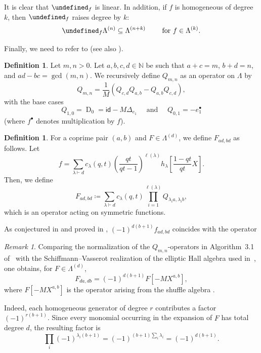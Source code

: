 \documentclass[reqno]{amsart}
\theoremstyle{plain}
\theoremstyle{definition}
\newtheorem{definition}[theorem]{Definition}
\theoremstyle{remark}
\newtheorem{remark}[theorem]{Remark}
\DeclareMathOperator{\D}{D}
\let\oldTheta\Theta
\let\Theta\undefined
\DeclareMathOperator{\Theta}{\oldTheta}
\newcommand{\<}{\langle}
\renewcommand{\>}{\rangle}
\begin{document}
It is clear that $\Theta_f$ is linear. In addition, if $f$ is homogeneous of degree $k$, then $\Theta_f$ raises degree by $k$:
\[\Theta_f \Lambda^{(n)} \subseteq \Lambda^{(n+k)} \qquad \text{ for } f \in \Lambda^{(k)}. \]

Finally, we need to refer to \cite[Algorithm~4.1]{BergeronGarsiaSergelXin2015CompositionalShuffleConjectures} (see also \cite[Definition~1.1, Theorem~2.5]{BergeronGarsiaSergelXin2016PlethysticOperators}).

\begin{definition}
    Let $m, n > 0$. Let $a,b,c,d \in \mathbb{N}$ be such that $a+c=m$, $b+d=n$, and $ad-bc = \gcd(m,n)$. We recursively define $Q_{m,n}$ as an operator on $\Lambda$ by \[ Q_{m,n} = \frac{1}{M} \left( Q_{c,d} Q_{a,b} - Q_{a,b} Q_{c,d} \right), \] with the base cases \[ Q_{1,0} = \D_0 = \mathsf{id} - M \Delta_{e_1} \quad \text{ and } \quad Q_{0,1} = - e_1^\bullet \] (where $f^\bullet$ denotes multiplication by $f$).
\end{definition}

\begin{definition}
    \label{def:hall-algebra-op}
    For a coprime pair $(a,b)$ and $F \in \Lambda^{(d)}$, we define $F_{ad,bd}$ as follows. Let \[ f = \sum_{\lambda \vdash d} c_\lambda(q,t) \left( \frac{qt}{qt-1} \right)^{\ell(\lambda)} h_\lambda \left[ \frac{1-qt}{qt} X \right]. \] Then, we define \[ F_{ad,bd} \coloneqq \sum_{\lambda \vdash d} c_\lambda(q,t) \prod_{i=1}^{\ell(\lambda)} Q_{\lambda_i a, \lambda_i b}, \]
    which is an operator acting on symmetric functions.
\end{definition}

As conjectured in \cite{BergeronGarsiaSergelXin2016PlethysticOperators} and proved in \cite{Mellit2021Rational}, $(-1)^{d(b+1)} f_{ad,bd}$ coincides with the operator 

\begin{remark}
    \label{rmk:eha-notation}
    Comparing the normalization of the $Q_{m,n}$-operators in Algorithm~3.1 of~\cite{BergeronGarsiaSergelXin2015CompositionalShuffleConjectures} with the Schiffmann--Vasserot realization of the elliptic Hall algebra used in~\cite{BHMPS2023ShuffleAnyLine}, one obtains, for $F \in \Lambda^{(d)}$,
    \[
        F_{da,db}= (-1)^{d(b+1)} F[-MX^{a,b}],
    \]
    where $F[-MX^{a,b}]$ is the operator arising from the shuffle algebra \cite{Negut2014ShuffleAlgebra}.

    Indeed, each homogeneous generator of degree $r$ contributes a factor $(-1)^{r(b+1)}$. Since every monomial occurring in the expansion of $F$ has total degree $d$, the resulting factor is
    \[
        \prod_i (-1)^{\lambda_i(b+1)}
        =(-1)^{(b+1)\sum_i\lambda_i}
        =(-1)^{d(b+1)}.
    \]
\end{remark}
\end{document}
